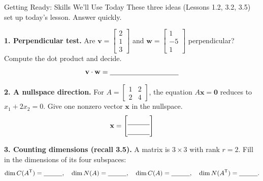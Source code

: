 \documentclass[10pt]{article}
\newcommand{\vv}{\mathbf{v}}
\newcommand{\ww}{\mathbf{w}}
\newcommand{\xx}{\mathbf{x}}
\newcommand{\T}{\mathsf{T}}
\begin{document}
\namedateperiod

\vspace{0.12in}

\begin{notesbox}{Getting Ready: Skills We'll Use Today}
\small These three ideas (Lessons 1.2, 3.2, 3.5) set up today's lesson. Answer quickly.

\vspace{4pt}
\textbf{1. Perpendicular test.} Are $\vv=\begin{bmatrix} 2 \\ 1 \\ 3 \end{bmatrix}$ and
$\ww=\begin{bmatrix} 1 \\ -5 \\ 1 \end{bmatrix}$ perpendicular? Compute the dot product and decide.
\[
  \vv\cdot\ww = \blank{3.4cm}
\]

\vspace{4pt}
\textbf{2. A nullspace direction.} For $A=\begin{bmatrix} 1 & 2 \\ 2 & 4 \end{bmatrix}$, the equation
$A\xx=\mathbf{0}$ reduces to $x_1+2x_2=0$. Give one nonzero vector $\xx$ in the nullspace.
\[
  \xx = \begin{bmatrix}\rule{0pt}{1.1em}\blank{1.1cm}\\[2pt]\blank{1.1cm}\end{bmatrix}
\]

\vspace{4pt}
\textbf{3. Counting dimensions (recall 3.5).} A matrix is $3\times 3$ with rank $r=2$. Fill in the
dimensions of its four subspaces:
\[
  \dim C(A^{\T}) = \blank{1.0cm},\quad \dim N(A) = \blank{1.0cm},\quad
  \dim C(A) = \blank{1.0cm},\quad \dim N(A^{\T}) = \blank{1.0cm}.
\]
\end{notesbox}
\end{document}
